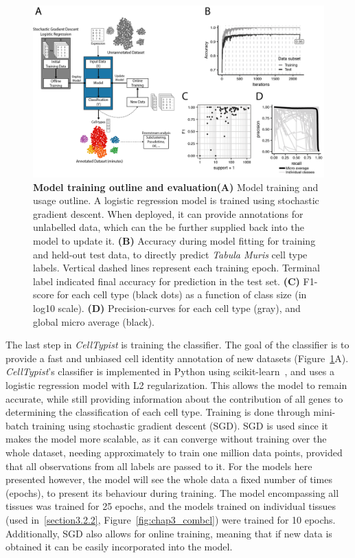 \begin{figure}[ht!]
    \centering
    \includegraphics[width=1.0\textwidth]{Chapter3/Figs/chap3_model.png} %
    \caption[Model training outline and evaluation]{\textbf{Model training outline and evaluation}\newline\textbf{(A)} Model training and usage outline. A logistic regression model is trained using stochastic gradient descent. When deployed, it can provide annotations for unlabelled data, which can the be further supplied back into the model to update it. \textbf{(B)} Accuracy during model fitting for training and held-out test data, to directly predict \textit{Tabula Muris} cell type labels. Vertical dashed lines represent each training epoch. Terminal label indicated final accuracy for prediction in the test set. \textbf{(C)} F1-score for each cell type (black dots) as a function of class size (in log10 scale). \textbf{(D)} Precision-curves for each cell type (gray), and global micro average (black).}
    \label{fig:chap3_model}
\end{figure}

The last step in \textit{CellTypist} is training the classifier. The goal of the classifier is to provide a fast and unbiased cell identity annotation of new datasets (Figure~\ref{fig:chap3_model}A). \textit{CellTypist}'s classifier is implemented in Python using scikit-learn~\citep{scikit-learn}, and uses a logistic regression model with L2 regularization. This allows the model to remain accurate, while still providing information about the contribution of all genes to determining the classification of each cell type. Training is done through mini-batch training using stochastic gradient descent (SGD). SGD is used since it makes the model more scalable, as it can converge without training over the whole dataset, needing approximately to train one million data points, provided that all observations from all labels are passed to it. For the models here presented however, the model will see the whole data a fixed number of times (epochs), to present its behaviour during training. The model encompassing all tissues was trained for 25 epochs, and the models trained on individual tissues (used in~\ref{section3.2.2}, Figure~\ref{fig:chap3_combcl}) were trained for 10 epochs. Additionally, SGD also allows for online training, meaning that if new data is obtained it can be easily incorporated into the model.

